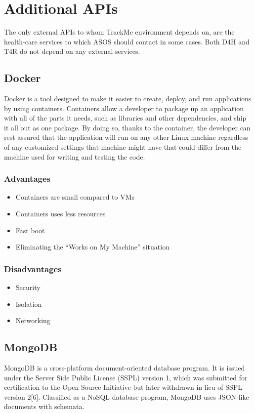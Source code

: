 \documentclass[a4paper, hidelinks, 12pt]{report}
\begin{document}
	\section{Additional APIs}
The only external APIs to whom TrackMe environment depends on, are the health-care services to which ASOS should contact in some cases. Both D4H and T4R do not depend on any external services.


\subsection{Docker}
Docker is a tool designed to make it easier to create, deploy, and run applications by using containers. Containers allow a developer to package up an application with all of the parts it needs, such as libraries and other dependencies, and ship it all out as one package. By doing so, thanks to the container, the developer can rest assured that the application will run on any other Linux machine regardless of any customized settings that machine might have that could differ from the machine used for writing and testing the code.

\subsubsection{Advantages}

\begin{itemize}
\item{} Containers are small compared to VMs
\item{} Containers uses less resources
\item{} Fast boot
\item{} Eliminating the “Works on My Machine” situation

\end{itemize}
\subsubsection{Disadvantages}

\begin{itemize}
\item{} Security
\item{} Isolation
\item{} Networking

\end{itemize}

\subsection{MongoDB}
MongoDB is a cross-platform document-oriented database program. It is issued under the Server Side Public License (SSPL) version 1, which was submitted for certification to the Open Source Initiative but later withdrawn in lieu of SSPL version 2[6]. Classified as a NoSQL database program, MongoDB uses JSON-like documents with schemata.
\end{document}
